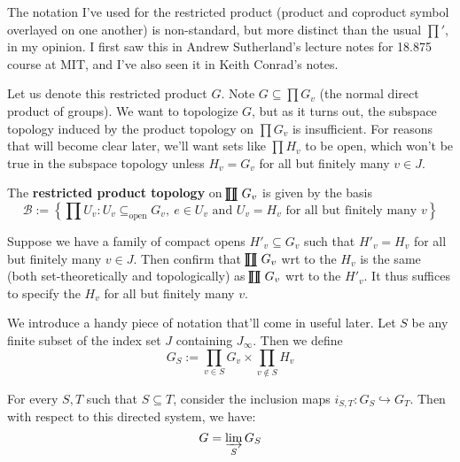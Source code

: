 \documentclass[11pt, x11names]{book}
\newcommand{\calb}{\mathcal{B}}
\newcommand{\inj}{\hookrightarrow}
\newcommand{\dlim}{\varinjlim}
\newcommand{\set}[1]{\left\{ #1 \right\}}
\newcommand{\rprod}{
    \mathrel{\ooalign{\hidewidth $\prod$ \hidewidth \cr $\coprod$}}
}
\begin{document}
\begin{remark}
The notation I've used for the restricted product (product and coproduct symbol overlayed on one another) is non-standard, but more distinct than the usual $\prod'$, in my opinion. I first saw this in Andrew Sutherland's lecture notes for 18.875 course at MIT, and I've also seen it in Keith Conrad's notes.
\end{remark}

Let us denote this restricted product $G$. Note $G \subseteq \prod G_v$ (the normal
direct product of groups). We want to topologize $G$, but as it turns out, the subspace topology induced by the product topology on $\prod G_v$ is insufficient. For reasons that will become clear later, we'll want sets like $\prod H_v$ to be open, which won't be true in the subspace topology unless $H_v = G_v$ for all but finitely many $v \in J$.

\begin{defn}
    The \textbf{restricted product topology} on $\rprod G_v$ is given by the basis
    \begin{equation*}
        \calb := \set{\prod U_v : U_v \subseteq_{\text{open}} G_v, \ e \in U_v \text{ and } U_v = H_v \text{ for all but finitely many } v}
    \end{equation*}
\end{defn}

\begin{sanitycheck}
Suppose we have a family of compact opens $H'_v \subseteq G_v$ such that $H'_v = H_v$ for all but finitely many $v \in J$. Then confirm that $\rprod G_v$ wrt to the $H_v$ is the same (both set-theoretically and topologically) as $\rprod G_v$ wrt to the $H'_v$. It thus suffices to specify the $H_v$ for all but finitely many $v$.
\end{sanitycheck}

We introduce a handy piece of notation that'll come in useful later. Let $S$ be any finite subset of the index set $J$ containing $J_\infty$. Then we define
\begin{equation*}
    G_S := \prod_{v \in S} G_v \times \prod_{v \notin S} H_v
\end{equation*}

For every $S, T$ such that $S \subseteq T$, consider the inclusion maps $i_{S, T}: G_S \inj G_T$. Then with respect to this directed system, we have:
\begin{equation*}
    G = \dlim_{S} G_S
\end{equation*}
\end{document}
